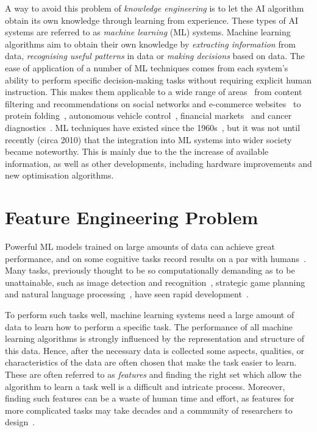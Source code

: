 A way to avoid this problem of \textit{knowledge engineering} is to let the AI algorithm obtain its own knowledge through learning from experience. These types of AI systems are referred to as \textit{machine learning} (ML) systems. Machine learning algorithms aim to obtain their own knowledge by \textit{extracting information} from data, \textit{recognising useful patterns} in data or \textit{making decisions} based on data. The ease of application of a number of ML techniques comes from each system's ability to perform specific decision-making tasks without requiring explicit human instruction. This makes them applicable to a wide range of areas~\cite{forthcoming} from content filtering and recommendations on social networks and e-commerce websites~\cite{de2010combining} to protein folding~\cite{varadi2022alphafold}, autonomous vehicle control~\cite{kuutti2020survey}, financial markets~\cite{cavalcante2016computational} and cancer diagnostics~\cite{huang2020artificial}. ML techniques have existed since the 1960s~\cite{minsky1969introduction, samuel1959some, nilsson1965learning}, but it was not until recently (circa 2010) that the integration into ML systems into wider society became noteworthy. This is mainly due to the the increase of available information, as well as other developments, including hardware improvements and new optimisation algorithms.  
\section{Feature Engineering Problem}
\label{featureeng}
Powerful ML models trained on large amounts of data can achieve great performance, and on some cognitive tasks record results on a par with humans~\cite{brown2017libratus, zhai2023can, silver2017mastering}. Many tasks, previously thought to be so computationally demanding as to be unattainable, such as image detection and recognition~\cite{HeZRS16}, strategic game planning~\cite{SilverHMGSDSAPL16} and natural language processing~\cite{DengHK13}, have seen rapid development~\cite{LeCunBH15}. 

To perform such tasks well, machine learning systems need a large amount of data to learn how to perform a specific task. The performance of all machine learning algorithms is strongly influenced by the representation and structure of this data. Hence, after the necessary data is collected some aspects, qualities, or characteristics of the data are often chosen that make the task easier to learn. These are often referred to as \textit{features} and finding the right set which allow the algorithm to learn a task well is a difficult and intricate process. Moreover, finding such features can be a waste of human time and effort, as features for more complicated tasks may take decades and a community of researchers to design~\cite{goodfellow2016deep}. 

